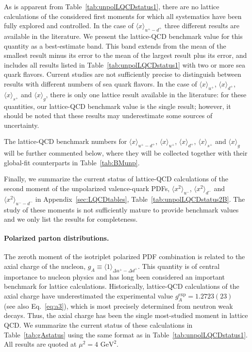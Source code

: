 
As is apparent from Table~\ref{tab:unpolLQCDstatus1}, there are no lattice 
calculations of the considered first moments for which all systematics 
have been fully explored and controlled.  
%
In the case of $\langle x\rangle_{u^+-d^+}$ three different results are available 
in the literature.
%
We present the lattice-QCD benchmark value for this quantity 
as a best-estimate band.
% 
This band extends from the mean of the smallest result minus its error 
to the mean of the largest result plus its error, and includes all results 
listed in Table~\ref{tab:unpolLQCDstatus1} with two or more sea 
quark flavors.
%
Current studies are not sufficiently precise to distinguish between 
results with different numbers of sea quark flavors.
%
In the case of $\langle x \rangle_{u^+}$, $\langle x \rangle_{d^+}$, 
$\langle x \rangle_{s^+}$ and $\langle x \rangle_g$, there is only one
lattice result available in the literature:
for these quantities, our lattice-QCD benchmark value is the single result; 
however, it should be noted that these results may underestimate some sources 
of uncertainty. 

The lattice-QCD benchmark numbers for $\langle x\rangle_{u^+-d^+}$,
$\langle x \rangle_{u^+}$, $\langle x \rangle_{d^+}$, 
$\langle x \rangle_{s^+}$ and $\langle x \rangle_g$ will be further
commented below, where they will be collected together with their 
global-fit counterparts in Table~\ref{tab:BMunp}.

Finally, we summarize the current status of lattice-QCD calculations of the 
second moment of the unpolarized valence-quark PDFs, 
$\langle x^2 \rangle_{u^-}$, $\langle x^2 \rangle_{d^-}$ and 
$\langle x^2\rangle_{u^--d^-}$ in Appendix~\ref{sec:LQCDtables},
Table~\ref{tab:unpolLQCDstatus2B}.
% 
The study of these moments is not sufficiently mature to provide benchmark 
values and we only list the results for completeness.

\paragraph{Polarized parton distributions.}
The zeroth moment of the isotriplet polarized PDF combination is related to the 
axial charge of the nucleon, $g_A\equiv \langle 1\rangle_{\Delta u^+-\Delta d^+}$.
%
This quantity is of central importance to nucleon physics and has long been 
considered an important benchmark for lattice calculations. 
%
Historically, lattice-QCD calculations of the axial charge have underestimated 
the experimental value $g_A^{\mathrm{exp}} = 1.2723(23)$~\cite{Olive:2016xmw}
(see also Eq.~\eqref{eq:a3}), 
which is most precisely determined from neutron weak decays. 
%
Thus, the axial charge has been the single most-studied moment in lattice QCD.
%
We summarize the current status of these calculations in 
Table~\ref{tab:gAstatus} using the same format as in 
Table~\ref{tab:unpolLQCDstatus1}.
%
All results are quoted at $\mu^2=4\mbox{ GeV}^2$.

